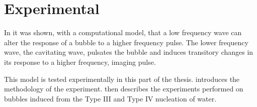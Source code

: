 
\part{Experimental}\label{part:experimental}

\begin{quote}

\end{quote}



In  it was shown, with a computational model,
that a low frequency wave can alter the response of a bubble to a higher frequency pulse.
The lower frequency wave, the cavitating wave,
pulsates the bubble and induces transitory changes in its response to a higher frequency, imaging pulse.

This model is tested experimentally in this part of the thesis.
 introduces the methodology of the experiment.
then describes the experiments performed on %
bubbles induced from the Type III and Type IV nucleation  of water.


